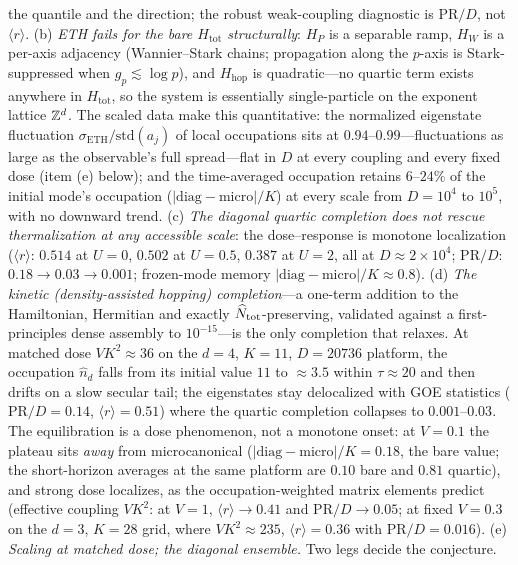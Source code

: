 \begin{remark}
the quantile and the direction; the robust weak-coupling diagnostic is $\mathrm{PR}/D$,
not $\langle r\rangle$. (b) \emph{ETH fails for the bare $H_{\mathrm{tot}}$
structurally}: $H_{P}$ is a separable ramp, $H_{W}$ is a per-axis adjacency
(Wannier--Stark chains; propagation along the $p$-axis is Stark-suppressed when
$g_{p}\lesssim\log p$), and $H_{\mathrm{hop}}$ is quadratic---no quartic term exists
anywhere in $H_{\mathrm{tot}}$, so the system is essentially single-particle on the
exponent lattice $\mathbb{Z}^{d}$. The scaled data make this quantitative: the normalized
eigenstate fluctuation $\sigma_{\mathrm{ETH}}/\mathrm{std}(a_{j})$ of local
occupations sits at $0.94$--$0.99$---fluctuations as large as the observable's full
spread---flat in $D$ at every coupling and every fixed dose (item (e) below); and the
time-averaged occupation retains
$6$--$24\%$ of the initial mode's occupation
($|\mathrm{diag}-\mathrm{micro}|/K$) at every scale from $D=10^{4}$ to $10^{5}$,
with no downward trend. (c) \emph{The diagonal quartic completion does not rescue
thermalization at any accessible scale}: the dose--response is monotone
localization ($\langle r\rangle$: $0.514$ at $U=0$, $0.502$ at $U=0.5$, $0.387$ at
$U=2$, all at $D\approx2\times10^{4}$; $\mathrm{PR}/D$: $0.18\to0.03\to0.001$;
frozen-mode memory $|\mathrm{diag}-\mathrm{micro}|/K\approx0.8$). (d) \emph{The kinetic (density-assisted hopping) completion}---a one-term addition to
the Hamiltonian, Hermitian and exactly $\widehat{N}_{\mathrm{tot}}$-preserving, validated against a
first-principles dense assembly to $10^{-15}$---is the only completion that relaxes. At
matched dose $VK^{2}\approx36$ on the $d=4$, $K=11$, $D=20736$ platform, the occupation
$\hat n_{d}$ falls from its initial value $11$ to $\approx3.5$ within $\tau\approx20$ and then
drifts on a slow secular tail; the eigenstates stay delocalized with GOE statistics
($\mathrm{PR}/D=0.14$, $\langle r\rangle=0.51$) where the quartic completion collapses to
$0.001$--$0.03$. The equilibration is a dose phenomenon, not a monotone onset: at $V=0.1$
the plateau sits \emph{away} from microcanonical ($|\mathrm{diag}-\mathrm{micro}|/K=0.18$,
the bare value; the short-horizon averages at the same platform are $0.10$ bare and $0.81$
quartic), and strong dose localizes, as the occupation-weighted matrix elements predict
(effective coupling $VK^{2}$: at $V=1$, $\langle r\rangle\to0.41$ and
$\mathrm{PR}/D\to0.05$; at fixed $V=0.3$ on the $d=3$, $K=28$ grid, where
$VK^{2}\approx235$, $\langle r\rangle=0.36$ with $\mathrm{PR}/D=0.016$).
(e) \emph{Scaling at matched dose; the diagonal ensemble.} Two legs decide the conjecture.

\end{remark}

